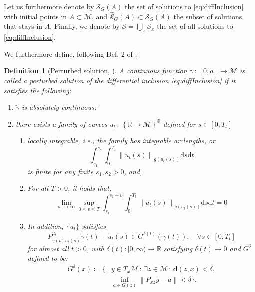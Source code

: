 \documentclass{article}
\newtheorem{definition}{Definition}
\newcommand{\CM}{\mathcal{M}}
\newcommand{\BR}{\mathbb{R}}
\newcommand{\rd}{\mathrm{d}}
\newcommand{\bd}{\mathbf{d}}
\newcommand{\norm}[1]{\left\lVert#1\right\rVert}
\begin{document}
Let us furthermore denote by $\mathcal{S}_{G}(A)$ the set of solutions to \eqref{eq:diffInclusion} with initial points in $A\subset \CM$, and $\widehat{\mathcal{S}}_G(A)\subset \mathcal{S}_G(A)$ the subset of solutions that stays in $A$. Finally, we denote  by $\mathcal{S}=\bigcup_x \mathcal{S}_x$ the set of all solutions to \eqref{eq:diffInclusion}.


We furthermore define, following Def. 2 of \cite{benaim2005stochastic}:
\begin{definition}[Perturbed solution, \cite{benaim2005stochastic}]
    A continuous function $\tilde\gamma\,:\,[0,a]\to\CM$ is called a perturbed solution of the differential inclusion \eqref{eq:diffInclusion} if it satisfies the following:
    \begin{enumerate}
        \item $\tilde\gamma$ is absolutely continuous;
        \item there exists a family of curves $u_t\,:\, \left\{\BR\to \CM\right\}^{\BR}$ defined for $s\in[0,T_t]$
        \begin{enumerate}
            \item locally integrable, i.e., the family has integrable arclengths, or \[\int_{s_1}^{s_2}\int_{0}^{T_t}\norm{\dot{u}_t(s)}_{g(u_t(s))} \rd s\rd t\] is finite for any finite $s_1,s_2>0$, and,
            \item For all $T>0$, it holds that, 
        \[
        \lim\limits_{s_1\to\infty}\sup\limits_{0\le v\le T}\int_{s_1}^{s_1+v}\int_{0}^{T_t}\norm{\dot{u}_t(s)}_{g(u_t(s))}\rd s\rd t = 0
        \]
        \item In addition, $\{u_t\}$ satisfies
        \begin{equation}
            P^{u_t}_{\tilde\gamma(t) u_t(s)}\dot{\tilde\gamma}(t)-\dot{u}_t(s)\in G^{\delta(t)}(\tilde\gamma(t)),\quad \forall s\in[0,T_t]
        \end{equation}
        for almost all $t>0$, with $\delta(t):[0,\infty)\to\mathbb{R}$ satisfying $\delta(t)\to 0$ and $G^{\delta}$ defined to be: 
        \begin{equation}
            \begin{aligned}
                G^{\delta}(x)\coloneqq \{ &y\in T_x\CM\,:\,\exists z\in\CM\,:\, \bd(z,x)<\delta,\\
                &\inf_{a\in G(z)}\norm{P_{xz}y-a}<\delta\}.
            \end{aligned}
        \end{equation}
        
        \end{enumerate}
    \end{enumerate}
\end{definition}
\end{document}
